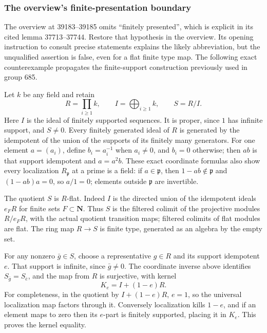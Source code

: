 \subsubsection{The overview's finite-presentation boundary}\label{algebra-proof-050-the-overviews-finite-presentation-boundary}

The overview at 39183--39185 omits ``finitely presented'', which is explicit in its cited lemma 37713--37744. Restore that hypothesis in the overview. Its opening instruction to consult precise statements explains the likely abbreviation, but the unqualified assertion is false, even for a flat finite type map. The following exact counterexample propagates the finite-support construction previously used in group 685.

Let \(k\) be any field and retain \[
R=\prod_{i\ge1}k,\qquad I=\bigoplus_{i\ge1}k,\qquad S=R/I.
\] Here \(I\) is the ideal of finitely supported sequences. It is proper, since \(1\) has infinite support, and \(S\ne0\). Every finitely generated ideal of \(R\) is generated by the idempotent of the union of the supports of its finitely many generators. For one element \(a=(a_i)\), define \(b_i=a_i^{-1}\) when \(a_i\ne0\), and \(b_i=0\) otherwise; then \(ab\) is that support idempotent and \(a=a^2b\). These exact coordinate formulas also show every localization \(R_{\mathfrak p}\) at a prime is a field: if \(a\in\mathfrak p\), then \(1-ab\notin\mathfrak p\) and \((1-ab)a=0\), so \(a/1=0\); elements outside \(\mathfrak p\) are invertible.

The quotient \(S\) is \(R\)-flat. Indeed \(I\) is the directed union of the idempotent ideals \(e_FR\) for finite sets \(F\subset\mathbf N\). Thus \(S\) is the filtered colimit of the projective modules \(R/e_FR\), with the actual quotient transition maps; filtered colimits of flat modules are flat. The ring map \(R\to S\) is finite type, generated as an algebra by the empty set.

For any nonzero \(\bar g\in S\), choose a representative \(g\in R\) and its support idempotent \(e\). That support is infinite, since \(\bar g\ne0\). The coordinate inverse above identifies \(S_{\bar g}=S_{\bar e}\), and the map from \(R\) is surjective, with kernel \[
K_e=I+(1-e)R.
\] For completeness, in the quotient by \(I+(1-e)R\), \(e=1\), so the universal localization map factors through it. Conversely localization kills \(1-e\), and if an element maps to zero then its \(e\)-part is finitely supported, placing it in \(K_e\). This proves the kernel equality.

